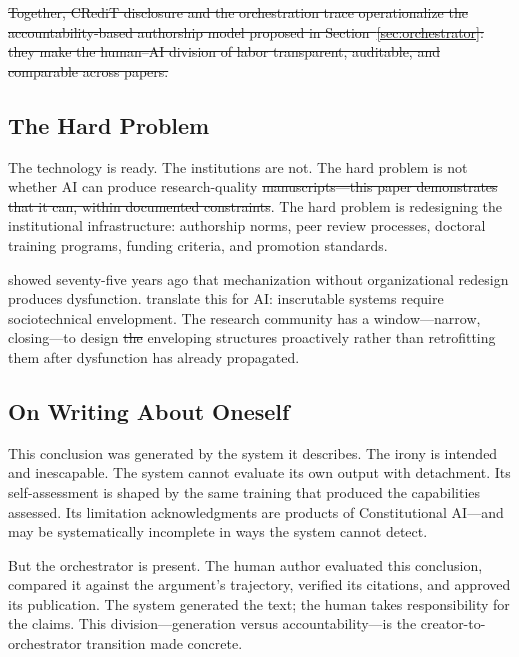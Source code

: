 \documentclass{article}
\providecommand{\DIFaddtex}[1]{{\protect\color{blue}\uwave{#1}}} %
\providecommand{\DIFdeltex}[1]{{\protect\color{red}\sout{#1}}}                      %
\providecommand{\DIFaddbegin}{} %
\providecommand{\DIFaddend}{} %
\providecommand{\DIFdelbegin}{} %
\providecommand{\DIFdelend}{} %
\providecommand{\DIFadd}[1]{\texorpdfstring{\DIFaddtex{#1}}{#1}} %
\providecommand{\DIFdel}[1]{\texorpdfstring{\DIFdeltex{#1}}{}} %
\newcommand{\DIFscaledelfig}{0.5}
\newlength{\DIFdelgraphicswidth} %
\newlength{\DIFdelgraphicsheight} %
\newcommand{\DIFaddincludegraphics}[2][]{{\color{blue}\fbox{\DIFOincludegraphics[#1]{#2}}}} %
\newcommand{\DIFdelincludegraphics}[2][]{%
\sbox{\DIFdelgraphicsbox}{\DIFOincludegraphics[#1]{#2}}%
\settoboxwidth{\DIFdelgraphicswidth}{\DIFdelgraphicsbox} %
\settoboxtotalheight{\DIFdelgraphicsheight}{\DIFdelgraphicsbox} %
\scalebox{\DIFscaledelfig}{%
\parbox[b]{\DIFdelgraphicswidth}{\usebox{\DIFdelgraphicsbox}\\[-\baselineskip] \rule{\DIFdelgraphicswidth}{0em}}\llap{\resizebox{\DIFdelgraphicswidth}{\DIFdelgraphicsheight}{%
\setlength{\unitlength}{\DIFdelgraphicswidth}%
\begin{picture}(1,1)%
\thicklines\linethickness{2pt} %
{\color[rgb]{1,0,0}\put(0,0){\framebox(1,1){}}}%
{\color[rgb]{1,0,0}\put(0,0){\line( 1,1){1}}}%
{\color[rgb]{1,0,0}\put(0,1){\line(1,-1){1}}}%
\end{picture}%
}\hspace*{3pt}}} %
} %
\DeclareRobustCommand{\DIFaddbegin}{\DIFOaddbegin \let\includegraphics\DIFaddincludegraphics} %
\DeclareRobustCommand{\DIFaddend}{\DIFOaddend \let\includegraphics\DIFOincludegraphics} %
\DeclareRobustCommand{\DIFdelbegin}{\DIFOdelbegin \let\includegraphics\DIFdelincludegraphics} %
\DeclareRobustCommand{\DIFdelend}{\DIFOaddend \let\includegraphics\DIFOincludegraphics} %
\begin{document}
\DIFdelbegin \DIFdel{Together, CRediT disclosure and the orchestration trace operationalize the accountability-based authorship model proposed in Section~\ref{sec:orchestrator}: they make the human--AI division of labor transparent, auditable, and comparable across papers.
}\DIFdelend %

\subsection{The Hard Problem}

The technology is ready. The institutions are not. The hard problem is not whether AI can produce research-quality \DIFdelbegin \DIFdel{manuscripts---this paper demonstrates that it can, within documented constraints}\DIFdelend \DIFaddbegin \DIFadd{manuscripts}\DIFaddend .
The hard problem is redesigning the institutional infrastructure: authorship norms, peer review processes, doctoral training programs, funding criteria, and promotion standards.

\citet{trist1951social} showed seventy-five years ago that mechanization without organizational redesign produces dysfunction. \citet{asatiani2021envelopment} translate this for AI: inscrutable systems require sociotechnical envelopment. The research community has a window---narrow, closing---to design \DIFdelbegin \DIFdel{the }\DIFdelend \DIFaddbegin \DIFadd{these }\DIFaddend enveloping structures proactively rather than retrofitting them after dysfunction has already propagated.

\subsection{On Writing About Oneself}

This conclusion was generated by the system it describes. The irony is intended and inescapable. The system cannot evaluate its own output with detachment. Its self-assessment is shaped by the same training that produced the capabilities assessed. Its limitation acknowledgments are products of Constitutional AI---and may be systematically incomplete in ways the system cannot detect.

But the orchestrator is present. The human author evaluated this conclusion, compared it against the argument's trajectory, verified its citations, and approved its publication. The system generated the text; the human takes responsibility for the claims. This division---generation versus accountability---is the creator-to-orchestrator transition made concrete.
\end{document}
